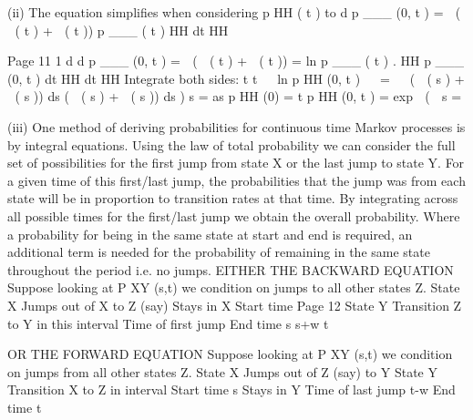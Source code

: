 \documentclass[a4paper,12pt]{article}
\begin{document}
(ii)
The equation simplifies when considering p HH ( t ) to
d
p ___ (0, t ) \;=\;  (  ( t ) \;+\;  ( t )) p ___ ( t )
HH
dt HH

Page 11%
1
d
d
p ___ (0, t ) \;=\;  (  ( t ) \;+\;  ( t )) \;=\; ln p ___ ( t ) .
HH
p ___ (0, t ) dt HH
dt
HH
Integrate both sides:
t
t
  ln p HH (0, t )   \;=

 (  ( s ) \;+\;  ( s )) ds 
(  ( s ) \;+\;  ( s )) ds ) %
s \;=
as p HH (0) \;=
t
p HH (0, t ) \;=\; exp  (

s \;=

(iii)
One method of deriving probabilities for continuous time Markov
processes is by integral equations. 
Using the law of total probability 
we can consider the full set of possibilities for the first
jump from state X or the last jump to state Y. 
For a given time of this first/last jump, the probabilities that the
jump was from each state will be in proportion to transition rates
at that time. %
By integrating across all possible times for the first/last jump
we obtain the overall probability. 
Where a probability for being in the same state at start and
end is required, an additional term is needed for the probability
of remaining in the same state throughout the period i.e. no jumps. 
EITHER THE BACKWARD EQUATION
Suppose looking at P XY (s,t) we condition on jumps to all other states Z.
State X
Jumps out of X to Z (say)
Stays in X
Start time
Page 12
State Y
Transition Z to Y in this interval
Time of first jump
End time%
s
s+w
t

OR THE FORWARD EQUATION
Suppose looking at P XY (s,t) we condition on jumps from all other states Z.
State X
Jumps out of Z (say) to Y
State Y
Transition X to Z in interval
Start time
s
Stays in Y
Time of last jump
t-w
End time
t
\end{document}
